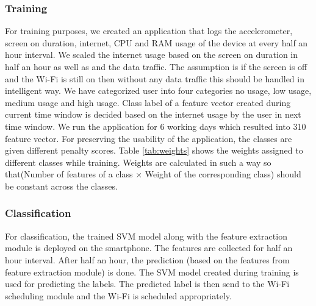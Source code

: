 \subsubsection{Training}
For training purposes, we created an application
that logs the accelerometer, screen on duration, internet, CPU and RAM usage of the device at every half an hour interval.
We scaled the internet usage based on 
the screen on duration in half an hour as well as and the data traffic. The assumption is 
if the screen is off and the Wi-Fi is still on then without any data traffic this should 
be handled in intelligent way.
We have categorized user into four categories 
no usage, low usage, medium usage
and high usage. Class label of a feature vector created during current time window is decided based on the internet usage by the user in next time window.
We run the application for 6 working days which resulted into 310 feature vector.
For preserving the usability
of the application, the classes are  given different penalty
scores. Table \ref{tab:weights} shows the weights assigned to different classes while training. Weights are calculated in such a way so that(Number of features of a class $\times$ Weight of the corresponding class) should be constant across the classes.


\begin{table}[h]
\begin{center}
\end{center}
\end{table}
\subsubsection{Classification}
For classification, the trained SVM model along with the feature extraction module is deployed on the smartphone. The features are collected for half an hour interval. After half an hour, the prediction (based on the features from feature extraction module) is done. The SVM model created during training is used for predicting the labels. The predicted label is then send to the Wi-Fi scheduling module and the Wi-Fi is scheduled appropriately. 

